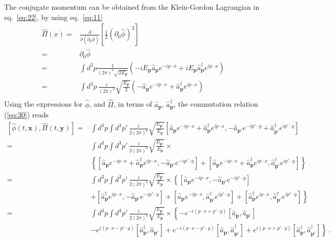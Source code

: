 The conjugate momentum can be obtained from the Klein-Gordon Lagrangian in eq.~\eqref{eq:22}, 
by using eq.~\eqref{eq:11}
\begin{align}
  \widehat{\Pi}(x)=&\frac{\partial}{\partial(\partial_0\widehat{\phi})}\left[\tfrac{1}{2}(\partial_0\widehat{\phi})^2\right]\nonumber\\
  =&\partial_0\widehat{\phi}\nonumber\\
  =&\int d^3p \frac{1}{(2\pi)^3\sqrt{2E_{\mathbf{p}} }}
  \left(-i E_{\mathbf{p}}\widehat{a}_{\mathbf{p}} e^{-i p\cdot x }+iE_{\mathbf{p}}\widehat{a}_{\mathbf{p}}^\dagger e^{i p\cdot x }\right)\nonumber\\
  =&\int d^3p\,\frac{i}{(2\pi)^3}\sqrt{\frac{E_\mathbf{p}}{2}}
  \left(-\widehat{a}_{\mathbf{p}} e^{-i p\cdot x }+\widehat{a}_{\mathbf{p}}^\dagger e^{i p\cdot x }\right)\nonumber\\
\end{align}
Using the expressions for $\widehat{\phi}$, and $\widehat{\Pi}$, in terms of $\widehat{a}_\mathbf{p}$, $\widehat{a}_\mathbf{p}^\dagger$, the commutation relation (\ref{eq:30}) reads 
\begin{align}
\left[\widehat{\phi}(t,\mathbf{x}),\widehat{\Pi}(t,\mathbf{y})\right]=&
\int d^3p\int d^3p'\,\frac{i}{2(2\pi)^6}\sqrt{\frac{E_{\mathbf{p}'}}{E_{\mathbf{p}}}}
\left[\widehat{a}_\mathbf{p} e^{-i p\cdot x }+\widehat{a}_\mathbf{p}^\dagger e^{i p\cdot x },
-\widehat{a}_{\mathbf{p}'} e^{-i p'\cdot y }+\widehat{a}_{\mathbf{p}'}^\dagger e^{i p'\cdot y }\right]\nonumber\\
=&
\int d^3p\int d^3p'\,\frac{i}{2(2\pi)^6}\sqrt{\frac{E_{\mathbf{p}'}}{E_{\mathbf{p}}}}\times\nonumber\\
&\left\{ \left[\widehat{a}_\mathbf{p} e^{-i p\cdot x }+\widehat{a}_\mathbf{p}^\dagger e^{i p\cdot x },-\widehat{a}_{\mathbf{p}'} e^{-i p'\cdot y }\right]
+\left[\widehat{a}_\mathbf{p} e^{-i p\cdot x }+\widehat{a}_\mathbf{p}^\dagger e^{i p\cdot x },\widehat{a}_{\mathbf{p}'}^\dagger e^{i p'\cdot y }\right]\right\}\nonumber\\
=&
\int d^3p\int d^3p'\,\frac{i}{2(2\pi)^6}\sqrt{\frac{E_{\mathbf{p}'}}{E_{\mathbf{p}}}}\times\left\{ 
\left[\widehat{a}_\mathbf{p} e^{-i p\cdot x },-\widehat{a}_{\mathbf{p}'} e^{-i p'\cdot y }\right]\right.\nonumber\\
&\left.
+\left[\widehat{a}_\mathbf{p}^\dagger e^{i p\cdot x },-\widehat{a}_{\mathbf{p}'} e^{-i p'\cdot y }\right]
+\left[\widehat{a}_\mathbf{p} e^{-i p\cdot x },\widehat{a}_{\mathbf{p}'}^\dagger e^{i p'\cdot y }\right]
+\left[\widehat{a}_\mathbf{p}^\dagger e^{i p\cdot x },\widehat{a}_{\mathbf{p}'}^\dagger e^{i p'\cdot y }\right]
\right\}\nonumber\\
=&
\int d^3p\int d^3p'\,\frac{i}{2(2\pi)^6}\sqrt{\frac{E_{\mathbf{p}'}}{E_{\mathbf{p}}}}\times\left\{ 
-e^{-i (p\cdot x+p'\cdot y) }\left[\widehat{a}_\mathbf{p} ,\widehat{a}_{\mathbf{p}'} \right]\right.\nonumber\\
&\left.
-e^{i (p\cdot x- p'\cdot y) }\left[\widehat{a}_\mathbf{p}^\dagger ,\widehat{a}_{\mathbf{p}'} \right]
+e^{-i (p\cdot x- p'\cdot y) }\left[\widehat{a}_\mathbf{p} ,\widehat{a}_{\mathbf{p}'}^\dagger \right]
+e^{i (p\cdot x+ p'\cdot y) }\left[\widehat{a}_\mathbf{p}^\dagger ,\widehat{a}_{\mathbf{p}'}^\dagger \right]
\right\}\,.
\end{align}
